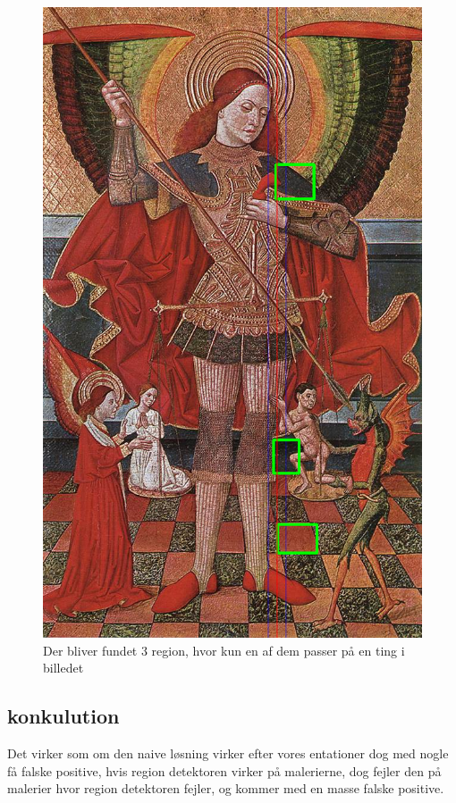 \begin{figure}[h!!]
	\begin{center}
		\includegraphics[scale=0.3,angle=0]{afsnit/afprovning/billeder/naive_losning/naiv_virker_ikke3.png}
	\end{center}
	\caption[]{Der bliver fundet 3 region, hvor kun en af dem passer på en ting i billedet}
	\label{naiv_virker_ikke3}
\end{figure}
\clearpage

\subsection{konkulution}
Det virker som om den naive løsning virker efter vores entationer dog
med nogle få falske positive, hvis region detektoren virker på
malerierne, dog fejler den på malerier hvor region detektoren fejler, og
kommer med en masse falske positive.
